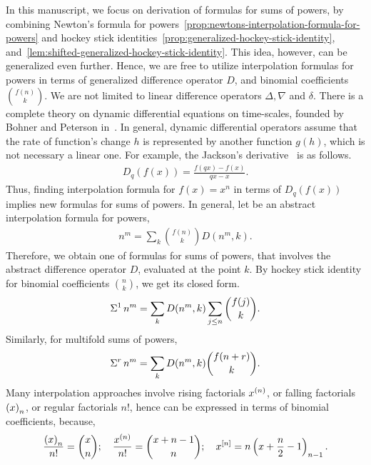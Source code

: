In this manuscript, we focus on derivation of formulas for sums of powers,
by combining
Newton's formula for
powers~\eqref{prop:newtons-interpolation-formula-for-powers}
and hockey stick
identities~\eqref{prop:generalized-hockey-stick-identity},
and~\eqref{lem:shifted-generalized-hockey-stick-identity}.
This idea, however, can be generalized even further.
Hence, we are free to utilize interpolation formulas for powers
in terms of generalized difference operator $D$,
and binomial coefficients $\binom{f(n)}{k}$.
We are not limited to linear difference operators $\Delta, \nabla$ and $\delta$.
There is a complete theory
on dynamic differential equations on time-scales, founded by
Bohner and Peterson in~\cite{Bohner2001DynamicEO}.
In general, dynamic differential operators assume that the rate of function's
change $h$ is represented by another function $g(h)$,
which is not necessary a linear one.
For example, the Jackson's derivative~\cite{jackson_1909} is as follows.
\begin{align*}
  D_q(f(x)) = \frac{f(qx) - f(x)}{qx-x}.
\end{align*}
Thus, finding interpolation formula for $f(x)=x^n$ in terms of $D_q(f(x))$
implies new formulas for sums of powers.
In general, let be an abstract interpolation formula for powers,
\begin{align*}
  n^m = \sum_{k} \binom{f(n)}{k} D(n^m, k).
\end{align*}
Therefore, we obtain one of formulas for sums of powers,
that involves the abstract difference operator
$D$, evaluated at the point $k$.
By hockey stick identity for binomial coefficients $\binom{n}{k}$,
we get its closed form.
\begin{align*}
  \Sigma^{1}\,{n}^{m} = \sum_{k} D(n^m, k) \sum_{j \leq n} \binom{f(j)}{k}.
\end{align*}
Similarly, for multifold sums of powers,
\begin{align*}
  \Sigma^{r}\,{n}^{m} = \sum_{k} D(n^m, k) \binom{f(n+r)}{k}.
\end{align*}
Many interpolation approaches involve rising factorials $x^{\left(n\right)}$,
or falling factorials $\left(x\right)_{n}$, or regular factorials $n!$,
hence can be expressed
in terms of binomial coefficients, because,
\begin{align*}
  \frac{\left(x\right)_{n}}{n!} = \binom{x}{n}; \quad
  \frac{x^{\left(n\right)}}{n!} = \binom{x+n-1}{n}; \quad
  x^{[n]} = n \left(x+\frac{n}{2}-1\right)_{n-1}.
\end{align*}
